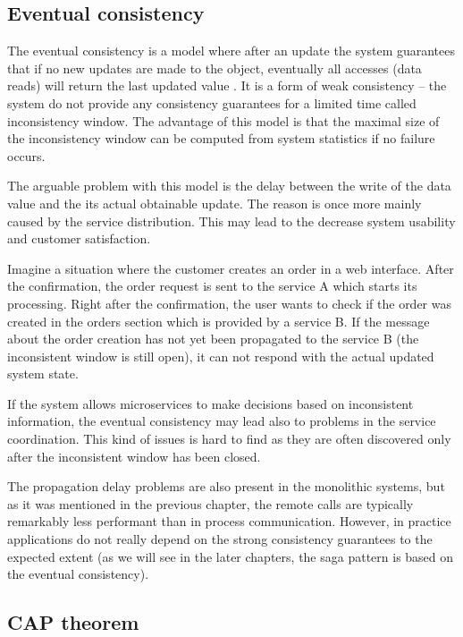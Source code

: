 \documentclass[oneside,
  digital, %
  table,   %
  nolof,     %
  nolot,     %
]{fithesis3}
\begin{document}
\subsection{Eventual consistency}
\label{sec:eventual-consistency}

The eventual consistency is a model where after an update the system guarantees that if no new updates are made to the object, eventually all accesses (data reads) will return the last updated value \cite{event_consist}. It is a form of weak consistency -- the system do not provide any consistency guarantees for a limited time called inconsistency window. The advantage of this model is that the maximal size of the inconsistency window can be computed from system statistics if no failure occurs.

The arguable problem with this model is the delay between the write of the data value and the its actual obtainable update. The reason is once more mainly caused by the service distribution. This may lead to the decrease system usability and customer satisfaction.

Imagine a situation where the customer creates an order in a web interface. After the confirmation, the order request is sent to the service A which starts its processing. Right after the confirmation, the user wants to check if the order was created in the orders section which is provided by a service B. If the message about the order creation has not yet been propagated to the service B (the inconsistent window is still open), it can not respond with the actual updated system state. 

If the system allows microservices to make decisions based on inconsistent information, the eventual consistency may lead also to problems in the service coordination. This kind of issues is hard to find as they are often discovered only after the inconsistent window has been closed.

The propagation delay problems are also present in the monolithic systems, but as it was mentioned in the previous chapter, the remote calls are typically remarkably less performant than in process communication. However, in practice applications do not really depend on the strong consistency guarantees to the expected extent (as we will see in the later chapters, the saga pattern is based on the eventual consistency). 

\subsection{CAP theorem}
\label{sec:cap-theorem}
\end{document}
